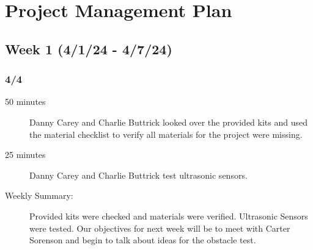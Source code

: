 \documentclass[11pt]{report}
\begin{document}
\SectionuseSubSectionSizing
\SubSectionuseSubSubSectionSizing
\setlength{\parindent}{0pt} %

\chapter{Project Management Plan}\label{ch:project-management-plan}

\section{Week 1 (4/1/24 - 4/7/24)}
\begin{adjustwidth}{0.5cm}{0cm}
\subsection*{4/4}
\begin{greylineformat}
\begin{description}
    \item [50 minutes] Danny Carey and Charlie Buttrick looked over the provided kits and used the material checklist to verify all materials for the project were missing.
    \item [25 minutes] Danny Carey and Charlie Buttrick test ultrasonic sensors.
\end{description}\end{greylineformat}

\begin{description}
    \item [Weekly Summary:] Provided kits were checked and materials were verified. Ultrasonic Sensors were tested. Our objectives for next week will be to meet with Carter Sorenson and begin to talk about ideas for the obstacle test.
\end{description}\vspace{0.5em}
\end{adjustwidth}
\end{document}
